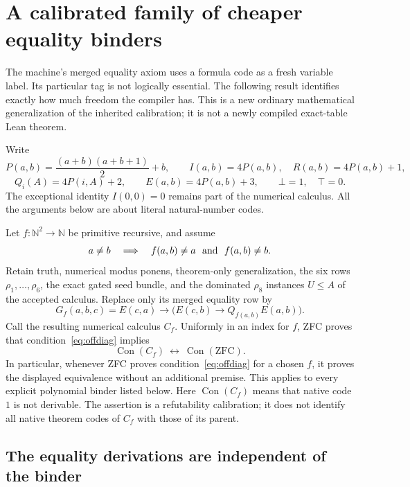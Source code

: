 \section{A calibrated family of cheaper equality binders}
\label{sec:binders}

The machine's merged equality axiom uses a formula code as a fresh
variable label. Its particular tag is not logically essential. The following
result identifies exactly how much freedom the compiler has. This is a
new ordinary mathematical generalization of the inherited calibration; it
is not a newly compiled exact-table Lean theorem.

Write
\[
 P(a,b)=\frac{(a+b)(a+b+1)}2+b,\qquad
 I(a,b)=4P(a,b),\quad R(a,b)=4P(a,b)+1,
\]
\[
 Q_i(A)=4P(i,A)+2,\qquad E(a,b)=4P(a,b)+3,
 \qquad \bot=1,\quad \top=0.
\]
The exceptional identity $I(0,0)=0$ remains part of the numerical
calculus. All the arguments below are about literal natural-number codes.

\begin{theorem}
\label{thm:flexible-binder}
Let $f:\mathbb N^2\to\mathbb N$ be primitive recursive, and assume
\begin{equation}
 a\ne b\quad\Longrightarrow\quad
 f(a,b)\ne a\ \hbox{ and }\ f(a,b)\ne b.
 \label{eq:offdiag}
\end{equation}
Retain truth, numerical modus ponens, theorem-only generalization,
the six rows $\rho_1,\ldots,\rho_6$, the exact gated seed bundle,
and the dominated $\rho_8$ instances $U\le A$ of the accepted calculus.
Replace only its merged equality row by
\begin{equation}
 G_f(a,b,c)=
 E(c,a)\to\bigl(E(c,b)\to Q_{f(a,b)}E(a,b)\bigr).
 \label{eq:gf}
\end{equation}
Call the resulting numerical calculus $C_f$. Uniformly in an index for
$f$, ZFC proves that condition~\eqref{eq:offdiag} implies
\[
 \operatorname{Con}(C_f)\ \longleftrightarrow\
 \operatorname{Con}(\mathrm{ZFC}).
\]
In particular, whenever ZFC proves condition~\eqref{eq:offdiag} for a
chosen $f$, it proves the displayed equivalence without an additional
premise. This applies to every explicit polynomial binder listed below.
Here $\operatorname{Con}(C_f)$ means that native code $1$ is not derivable.
The assertion is a refutability calibration; it does not identify all
native theorem codes of $C_f$ with those of its parent.
\end{theorem}

\subsection{The equality derivations are independent of the binder}

